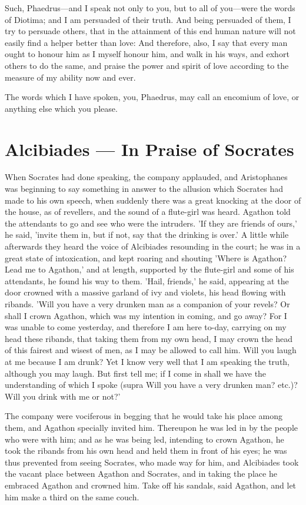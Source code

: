 \para[123] Such, Phaedrus---and I speak not only to you, but to all of you---were the words of Diotima; and I am persuaded of their truth. And being persuaded of them, I try to persuade others, that in the attainment of this end human nature will not easily find a helper better than love: And therefore, also, I say that every man ought to honour him as I myself honour him, and walk in his ways, and exhort others to do the same, and praise the power and spirit of love according to the measure of my ability now and ever.

\para[124] The words which I have spoken, you, Phaedrus, may call an encomium of love, or anything else which you please.

\section*{Alcibiades — In Praise of Socrates}

\para[125] When Socrates had done speaking, the company applauded, and Aristophanes was beginning to say something in answer to the allusion which Socrates had made to his own speech, when suddenly there was a great knocking at the door of the house, as of revellers, and the sound of a flute-girl was heard. Agathon told the attendants to go and see who were the intruders. 'If they are friends of ours,' he said, 'invite them in, but if not, say that the drinking is over.' A little while afterwards they heard the voice of Alcibiades resounding in the court; he was in a great state of intoxication, and kept roaring and shouting 'Where is Agathon? Lead me to Agathon,' and at length, supported by the flute-girl and some of his attendants, he found his way to them. 'Hail, friends,' he said, appearing at the door crowned with a massive garland of ivy and violets, his head flowing with ribands. 'Will you have a very drunken man as a companion of your revels? Or shall I crown Agathon, which was my intention in coming, and go away? For I was unable to come yesterday, and therefore I am here to-day, carrying on my head these ribands, that taking them from my own head, I may crown the head of this fairest and wisest of men, as I may be allowed to call him. Will you laugh at me because I am drunk? Yet I know very well that I am speaking the truth, although you may laugh. But first tell me; if I come in shall we have the understanding of which I spoke (supra Will you have a very drunken man? etc.)? Will you drink with me or not?'

\para[126] The company were vociferous in begging that he would take his place among them, and Agathon specially invited him. Thereupon he was led in by the people who were with him; and as he was being led, intending to crown Agathon, he took the ribands from his own head and held them in front of his eyes; he was thus prevented from seeing Socrates, who made way for him, and Alcibiades took the vacant place between Agathon and Socrates, and in taking the place he embraced Agathon and crowned him. Take off his sandals, said Agathon, and let him make a third on the same couch.

